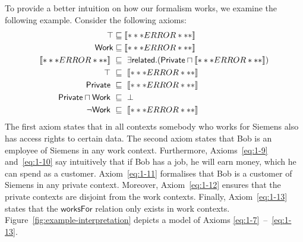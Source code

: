 \documentclass[final]{scrartcl}
\begin{document}
To provide a better intuition on how our formalism works, we examine the following example.
Consider the following axioms:
\begin{align}
  \top & \sqsubseteq \oax{\exists\mathsf{worksFor}.\{\text{\textit{Siemens}}\} \sqsubseteq \exists\mathsf{hasAccessRights}.\{\text{\textit{Siemens}}\}}\label{eq:1-7} \\
  \mathsf{Work} & \sqsubseteq \oax{\mathsf{worksFor}(\text{\textit{Bob}},\text{\textit{Siemens}})} \label{eq:1-8}\\
  \oax{(\exists\mathsf{worksFor}.\top)(\text{\textit{Bob}})}\
  & \sqsubseteq\ \exists\mathsf{related}.(\mathsf{Private} \sqcap \oax{\mathsf{HasMoney}(\text{\textit{Bob}})})\label{eq:1-9} \\
  \top\
  & \sqsubseteq\ \oax{\exists\mathsf{isCustomerOf}.\top \sqsubseteq\mathsf{HasMoney}} \label{eq:1-10}\\
  \mathsf{Private}\
  & \sqsubseteq\ \oax{\mathsf{isCustomerOf}(\text{\textit{Bob}},\text{\textit{Siemens}})}\label{eq:1-11}\\
  \mathsf{Private} \sqcap \mathsf{Work}\
  & \sqsubseteq\ \bot\label{eq:1-12}\\
  \lnot \mathsf{Work}\
  & \sqsubseteq\ \oax{\exists\mathsf{worksFor}.\top\sqsubseteq\bot}\label{eq:1-13}
\end{align}
%
The first axiom states that in all contexts somebody who works for Siemens also has access rights to
certain data.  The second axiom states that Bob is an employee of Siemens in any work context.
Furthermore, Axioms~\eqref{eq:1-9} and~\eqref{eq:1-10} say intuitively that if Bob has a job, he
will earn money, which he can spend as a customer.  Axiom~\eqref{eq:1-11} formalises that Bob is a
customer of Siemens in any private context.  Moreover, Axiom~\eqref{eq:1-12} ensures that the
private contexts are disjoint from the work contexts.  Finally, Axiom~\eqref{eq:1-13} states that
the $\mathsf{worksFor}$ relation only exists in work
contexts. Figure~\ref{fig:example-interpretation} depicts a model of Axioms
\eqref{eq:1-7}~--~\eqref{eq:1-13}.
\end{document}
